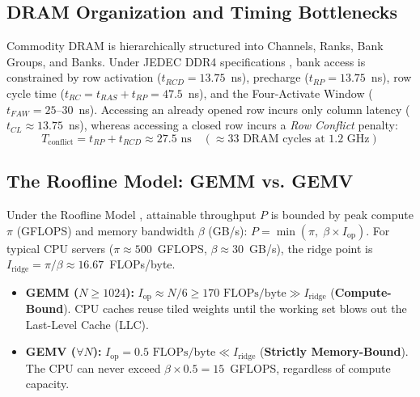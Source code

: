 \documentclass[10pt,twocolumn]{article}
\begin{document}
\subsection{DRAM Organization and Timing Bottlenecks}
Commodity DRAM is hierarchically structured into Channels, Ranks, Bank Groups, and Banks. Under JEDEC DDR4 specifications \cite{jedec2017ddr4}, bank access is constrained by row activation ($t_{RCD} = 13.75$~ns), precharge ($t_{RP} = 13.75$~ns), row cycle time ($t_{RC} = t_{RAS} + t_{RP} = 47.5$~ns), and the Four-Activate Window ($t_{FAW} = 25$--$30$~ns). Accessing an already opened row incurs only column latency ($t_{CL} \approx 13.75$~ns), whereas accessing a closed row incurs a \textit{Row Conflict} penalty:
\begin{equation}
    T_{\text{conflict}} = t_{RP} + t_{RCD} \approx 27.5\text{ ns} \quad (\approx 33\text{ DRAM cycles at 1.2~GHz})
\end{equation}

\subsection{The Roofline Model: GEMM vs. GEMV}
Under the Roofline Model \cite{williams2009roofline}, attainable throughput $P$ is bounded by peak compute $\pi$ (GFLOPS) and memory bandwidth $\beta$ (GB/s): $P = \min(\pi, \; \beta \times I_{\text{op}})$. For typical CPU servers ($\pi \approx 500$~GFLOPS, $\beta \approx 30$~GB/s), the ridge point is $I_{\text{ridge}} = \pi / \beta \approx 16.67$~FLOPs/byte.
\begin{itemize}
    \item \textbf{GEMM ($N \ge 1024$):} $I_{\text{op}} \approx N/6 \ge 170 \text{ FLOPs/byte} \gg I_{\text{ridge}}$ (\textbf{Compute-Bound}). CPU caches reuse tiled weights until the working set blows out the Last-Level Cache (LLC).
    \item \textbf{GEMV ($\forall N$):} $I_{\text{op}} = 0.5 \text{ FLOPs/byte} \ll I_{\text{ridge}}$ (\textbf{Strictly Memory-Bound}). The CPU can never exceed $\beta \times 0.5 = 15$~GFLOPS, regardless of compute capacity.
\end{itemize}
\end{document}
